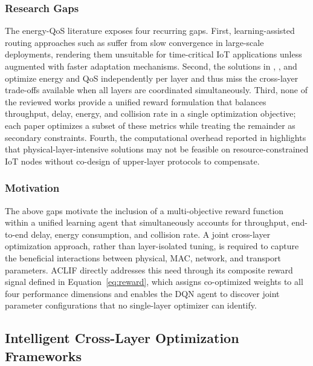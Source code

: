 \documentclass[a4paper]{cas-dc}
\numberwithin{equation}{section}
\begin{document}
\subsubsection*{Research Gaps}

The energy-QoS literature exposes four recurring gaps. First, learning-assisted routing approaches such as \cite{Haripriya2025673} suffer from slow convergence in large-scale deployments, rendering them unsuitable for time-critical IoT applications unless augmented with faster adaptation mechanisms. Second, the solutions in \cite{Waghmare2025}, \cite{Hannachi2025}, and \cite{Pradhan2025} optimize energy and QoS independently per layer and thus miss the cross-layer trade-offs available when all layers are coordinated simultaneously. Third, none of the reviewed works provide a unified reward formulation that balances throughput, delay, energy, and collision rate in a single optimization objective; each paper optimizes a subset of these metrics while treating the remainder as secondary constraints. Fourth, the computational overhead reported in \cite{Tran202411876} highlights that physical-layer-intensive solutions may not be feasible on resource-constrained IoT nodes without co-design of upper-layer protocols to compensate.

\subsubsection*{Motivation}

The above gaps motivate the inclusion of a multi-objective reward function within a unified learning agent that simultaneously accounts for throughput, end-to-end delay, energy consumption, and collision rate. A joint cross-layer optimization approach, rather than layer-isolated tuning, is required to capture the beneficial interactions between physical, MAC, network, and transport parameters. ACLIF directly addresses this need through its composite reward signal defined in Equation~\ref{eq:reward}, which assigns co-optimized weights to all four performance dimensions and enables the DQN agent to discover joint parameter configurations that no single-layer optimizer can identify.

\subsection{Intelligent Cross-Layer Optimization Frameworks}
\end{document}
